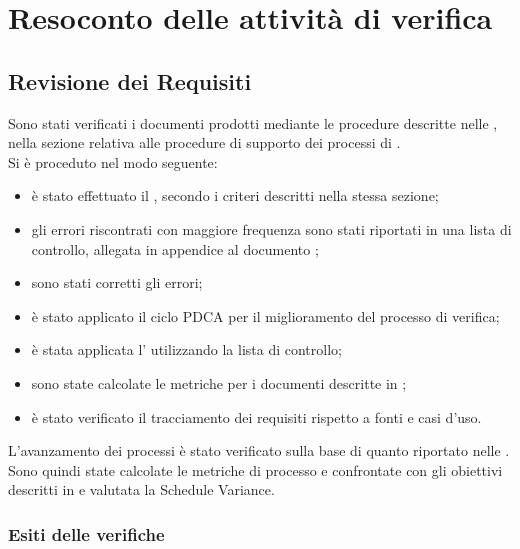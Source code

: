 \section{Resoconto delle attività di verifica}\label{app:resoconto_verifica}
\subsection{Revisione dei Requisiti}
Sono stati verificati i documenti prodotti mediante le procedure descritte nelle \NormeDiProgetto{}, nella sezione relativa alle procedure di supporto dei processi di \VV{}.\\
Si è proceduto nel modo seguente:\begin{itemize}
	\item è stato effettuato il , secondo i criteri descritti nella stessa sezione;
	\item gli errori riscontrati con maggiore frequenza sono stati riportati in una lista di controllo, allegata in appendice al documento \NormeDiProgetto{};
	\item sono stati corretti gli errori;
	\item è stato applicato il ciclo PDCA per il miglioramento del processo di verifica;
	\item è stata applicata l' utilizzando la lista di controllo;
	\item sono state calcolate le metriche per i documenti descritte in \NormeDiProgetto{};
	\item è stato verificato il tracciamento dei requisiti rispetto a fonti e casi d'uso.
\end{itemize}
L'avanzamento dei processi è stato verificato sulla base di quanto riportato nelle \NormeDiProgetto{}. Sono quindi state calcolate le metriche di processo e confrontate con gli obiettivi descritti in  e valutata la Schedule Variance.

\subsubsection{Esiti delle verifiche}
